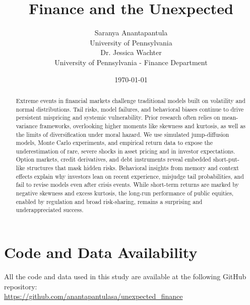 \documentclass[12pt,a4paper]{article}
\title{\Large \textbf{Finance and the Unexpected}}
\author{
Saranya Anantapantula\\
\small University of Pennsylvania\\
Dr. Jessica Wachter\\
\small University of Pennsylvania - Finance Department
}
\date{\today}
\begin{document}
\maketitle

\begin{abstract}
Extreme events in financial markets challenge traditional models built on volatility and normal distributions. Tail risks, model failures, and behavioral biases continue to drive persistent mispricing and systemic vulnerability. Prior research often relies on mean-variance frameworks, overlooking higher moments like skewness and kurtosis, as well as the limits of diversification under moral hazard. We use simulated jump-diffusion models, Monte Carlo experiments, and empirical return data to expose the underestimation of rare, severe shocks in asset pricing and in investor expectations. Option markets, credit derivatives, and debt instruments reveal embedded short-put-like structures that mask hidden risks. Behavioral insights from memory and context effects explain why investors lean on recent experience, misjudge tail probabilities, and fail to revise models even after crisis events. While short-term returns are marked by negative skewness and excess kurtosis, the long-run performance of public equities, enabled by regulation and broad risk-sharing, remains a surprising and underappreciated success.
\end{abstract}











\appendix
\section{Code and Data Availability} \label{appendix:code}

All the code and data used in this study are available at the following GitHub repository: \\
\url{https://github.com/anantapantulasa/unexpected_finance}



\end{document}
